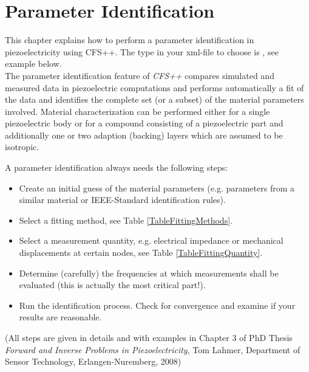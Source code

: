\chapter{Parameter Identification} \label{paramIdent}
%
%
This chapter explains how to perform a parameter identification in piezoelectricity using CFS++. 
The  type in your xml-file to choose is , see
example below.\\


The parameter identification feature of {\it CFS++} compares simulated and
measured data in piezoelectric computations and performs automatically a fit of
the data and identifies the complete set (or a subset) of the material
parameters involved.
Material characterization can be performed either for a single piezoelectric
body or for a compound consisting of a piezoelectric part and additionally one
or two adaption (backing) layers which are assumed to be isotropic.

A parameter identification always needs the following steps:
\begin{itemize}
\item Create an initial guess of the material parameters (e.g. parameters from a
similar material or IEEE-Standard identification rules). 
\item Select a fitting method, see Table \ref{TableFittingMethods}.
\item Select a measurement quantity, e.g. electrical impedance or mechanical
displacements at certain nodes, see Table \ref{TableFittingQuantity}.
\item Determine (carefully) the frequencies at which measurements shall be
evaluated (this is actually the most critical part!).
\item Run the identification process. Check for convergence and examine if your
results are reasonable.
\end{itemize}
 (All steps are given in details and with examples in Chapter 3 of PhD Thesis
{\it Forward and Inverse Problems in Piezoelectricity}, Tom Lahmer, Department
of Sensor Technology, Erlangen-Nuremberg, 2008)\\ \newpage

